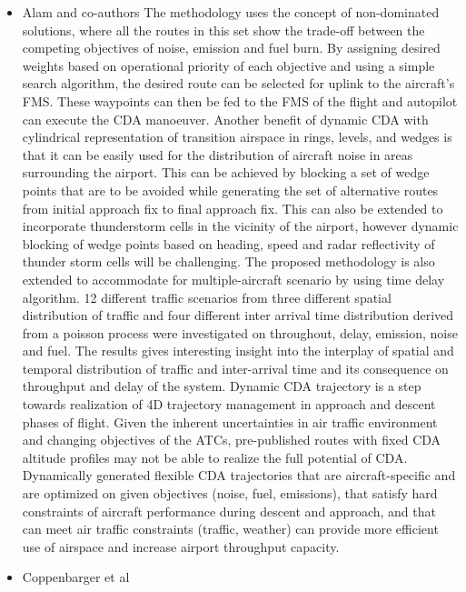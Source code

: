 \documentclass{aer1315-pretty}
\begin{document}
\begin{itemize}
\item Alam and co-authors \cite{Alam:2010} 
      The methodology uses the concept of
non-dominated solutions, where all the routes in this
set show the trade-off between the competing
objectives of noise, emission and fuel burn. By
assigning desired weights based on operational
priority of each objective and using a simple search
algorithm, the desired route can be selected for uplink
to the aircraft's FMS. These waypoints can then be fed
to the FMS of the flight and autopilot can execute the
CDA manoeuver.
      Another benefit of dynamic CDA with
cylindrical representation of transition airspace in
rings, levels, and wedges is that it can be easily used
for the distribution of aircraft noise in areas
surrounding the airport. This can be achieved by
blocking a set of wedge points that are to be avoided
while generating the set of alternative routes from
initial approach fix to final approach fix. This can also
be extended to incorporate thunderstorm cells in the
vicinity of the airport, however dynamic blocking of
wedge points based on heading, speed and radar
reflectivity of thunder storm cells will be challenging.
      The proposed methodology is also extended to
accommodate for multiple-aircraft scenario by using
time delay algorithm. 12 different traffic scenarios
from three different spatial distribution of traffic and
four different inter arrival time distribution derived
from a poisson process were investigated on
throughout, delay, emission, noise and fuel. The
results gives interesting insight into the interplay of
spatial and temporal distribution of traffic and
inter-arrival time and its consequence on throughput
and delay of the system.
     Dynamic CDA trajectory is a step towards
realization of 4D trajectory management in approach
and descent phases of flight. Given the inherent
uncertainties in air traffic environment and changing
objectives of the ATCs, pre-published routes with
fixed CDA altitude profiles may not be able to realize
the full potential of CDA. Dynamically generated
flexible CDA trajectories that are aircraft-specific and
are optimized on given objectives (noise, fuel,
emissions), that satisfy hard constraints of aircraft
performance during descent and approach, and that
can meet air traffic constraints (traffic, weather) can
provide more efficient use of airspace and increase
airport throughput capacity.


\item Coppenbarger et al \cite{Copp:2010b} 


\end{itemize}
\end{document}
